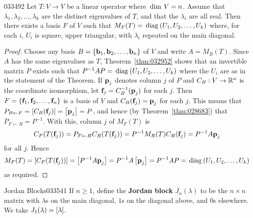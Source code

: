 \begin{theorem}{}{033492}
Let $T : V \to V$ be a linear operator where $\thinspace\operatorname{dim \medspace}V = n$. Assume that $\lambda_{1}, \lambda_{2}, \dots, \lambda_{k}$ are the distinct eigenvalues of $T$, and that the $\lambda_{i}$ are all real. Then there exists a basis $F$ of $V$ such that $M_{F}(T) = \thinspace\operatorname{diag\medspace}(U_{1}, U_{2}, \dots, U_{k})$ where, for each $i$, $U_{i}$ is square, upper triangular, with $\lambda_{i}$ repeated on the main diagonal.
\end{theorem}

\begin{proof}
Choose any basis $B = \{\textbf{b}_{1}, \textbf{b}_{2}, \dots, \textbf{b}_{n}\}$ of $V$ and write $A = M_{B}(T)$. Since $A$ has the same eigenvalues as $T$, Theorem~\ref{thm:032952} shows that an invertible matrix $P$ exists such that $P^{-1}AP = \thinspace\operatorname{diag\medspace}(U_{1}, U_{2}, \dots, U_{k})$ where the $U_{i}$ are as in the statement of the Theorem. If $\textbf{p}_{j}$ denotes column $j$ of $P$ and $C_{B} : V \to \mathbb{R}^n$ is the coordinate isomorphism, let $\textbf{f}_j = C^{-1}_B (\textbf{p}_j)$ for each $j$. Then $F = \{\textbf{f}_{1}, \textbf{f}_{2}, \dots, \textbf{f}_{n}\}$ is a basis of $V$ and $C_{B}(\textbf{f}_{j}) = \textbf{p}_{j}$ for each $j$. This means that $P_{B \gets F} = \left[ C_{B}(\textbf{f}_{j}) \right] = \left[ \textbf{p}_{j} \right] = P$, and hence (by Theorem~\ref{thm:028683}) that $P_{F \gets B} = P^{-1}$. With this, column $j$ of $M_{F}(T)$ is
\begin{equation*}
C_F(T(\textbf{f}_j)) = P_{F \leftarrow B}C_B(T(\textbf{f}_j)) = P^{-1}M_B(T)C_B(\textbf{f}_j) = P^{-1}A\textbf{p}_j
\end{equation*}
for all $j$. Hence
\begin{equation*}
M_F(T) = \left[ C_F(T(\textbf{f}_j)) \right] = \left[ P^{-1}A\textbf{p}_j \right] = P^{-1}A \left[ \textbf{p}_j \right] = P^{-1}AP = \thinspace\operatorname{diag\medspace}(U_1, U_2, \dots, U_k)
\end{equation*}
as required.
\end{proof}

\begin{definition}{Jordan Blocks}{033541}
If $n \geq 1$, define the \textbf{Jordan block} $J_{n}(\lambda)$ to be the $n \times n$ matrix with $\lambda$s on the main diagonal, $1$s on the diagonal above, and $0$s elsewhere. We take $J_{1}(\lambda) = \left[ \lambda \right]$.
\end{definition}

